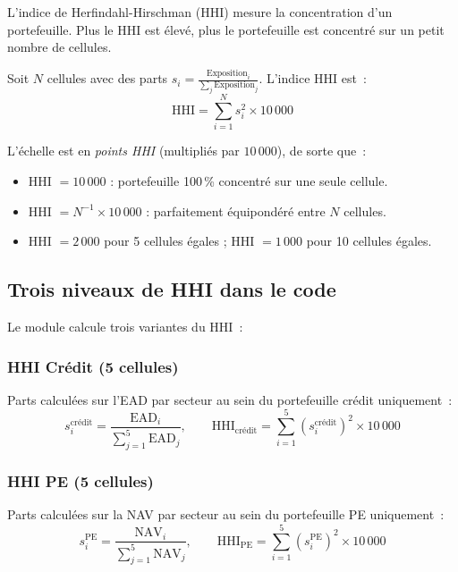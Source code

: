 \documentclass[12pt,a4paper]{article}
\begin{document}
L'indice de Herfindahl-Hirschman (HHI) mesure la concentration d'un portefeuille. Plus le HHI est \'elev\'e, plus le portefeuille est concentr\'e sur un petit nombre de cellules.

\begin{formulebox}
Soit $N$ cellules avec des parts $s_i = \frac{\text{Exposition}_i}{\sum_j \text{Exposition}_j}$. L'indice HHI est~:
\begin{equation}
    \text{HHI} = \sum_{i=1}^{N} s_i^2 \times 10\,000
    \label{eq:hhi_general}
\end{equation}
\end{formulebox}

L'\'echelle est en \emph{points HHI} (multipli\'es par $10\,000$), de sorte que~:
\begin{itemize}[nosep]
    \item HHI $= 10\,000$ : portefeuille 100\,\% concentr\'e sur une seule cellule.
    \item HHI $= N^{-1} \times 10\,000$ : parfaitement \'equipond\'er\'e entre $N$ cellules.
    \item HHI $= 2\,000$ pour 5 cellules \'egales ; HHI $= 1\,000$ pour 10 cellules \'egales.
\end{itemize}

\subsection{Trois niveaux de HHI dans le code}

Le module calcule trois variantes du HHI~:

\subsubsection{HHI Cr\'edit (5 cellules)}
Parts calcul\'ees sur l'EAD par secteur au sein du portefeuille cr\'edit uniquement~:
\begin{equation}
    s_i^{\text{cr\'edit}} = \frac{\text{EAD}_i}{\sum_{j=1}^{5}\text{EAD}_j}, \qquad
    \text{HHI}_{\text{cr\'edit}} = \sum_{i=1}^{5} \left(s_i^{\text{cr\'edit}}\right)^2 \times 10\,000
    \label{eq:hhi_credit}
\end{equation}

\subsubsection{HHI PE (5 cellules)}
Parts calcul\'ees sur la NAV par secteur au sein du portefeuille PE uniquement~:
\begin{equation}
    s_i^{\text{PE}} = \frac{\text{NAV}_i}{\sum_{j=1}^{5}\text{NAV}_j}, \qquad
    \text{HHI}_{\text{PE}} = \sum_{i=1}^{5} \left(s_i^{\text{PE}}\right)^2 \times 10\,000
    \label{eq:hhi_pe}
\end{equation}
\end{document}
